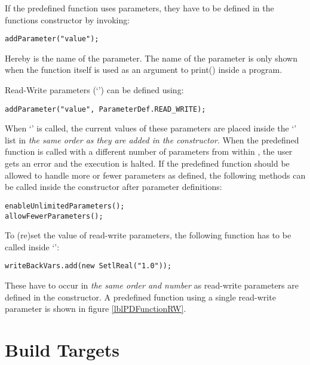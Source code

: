 If the predefined function uses parameters, they have to be defined in the functions constructor by invoking:
\begin{lstlisting}[frame=none,numbers=none]
addParameter("value");
\end{lstlisting}

Hereby  is the name of the parameter. The name of the parameter is only shown when the function itself is used as an argument to print() inside a \SetlX{} program.

Read-Write parameters (`') can be defined using:
\begin{lstlisting}[frame=none,numbers=none]
addParameter("value", ParameterDef.READ_WRITE);
\end{lstlisting}

When `' is called, the current values of these parameters are placed inside the `' list in \emph{the same order as they are added in the constructor}. When the predefined function is called with a different number of parameters from within \SetlX{}, the user gets an error and the execution is halted. If the predefined function should be allowed to handle more or fewer parameters as defined, the following methods can be called inside the constructor after parameter definitions:
\begin{lstlisting}[frame=none,numbers=none]
enableUnlimitedParameters();
allowFewerParameters();
\end{lstlisting}

To (re)set the value of read-write parameters, the following function has to be called inside `':
\begin{lstlisting}[frame=none,numbers=none]
writeBackVars.add(new SetlReal("1.0"));
\end{lstlisting}

These have to occur in \emph{the same order and number} as read-write parameters are defined in the constructor. A predefined function using a single read-write parameter is shown in figure \ref{lblPDFunctionRW}.


\section{Build Targets}

